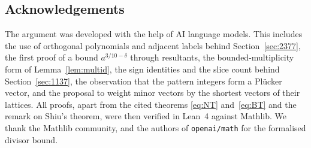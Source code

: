 \documentclass[11pt]{amsart}
\theoremstyle{definition}
\theoremstyle{remark}
\newcommand{\lean}[1]{\texttt{#1}}
\begin{document}
\subsection*{Acknowledgements}
The argument was developed with the help of AI language models. This includes the use of
orthogonal polynomials and adjacent labels behind Section~\ref{sec:2377}, the first proof of a
bound $a^{3/10-\delta}$ through resultants, the bounded-multiplicity form of
Lemma~\ref{lem:multid}, the sign identities and the slice count behind Section~\ref{sec:1137},
the observation that the pattern integers form a Pl\"ucker vector, and the proposal to weight
minor vectors by the shortest vectors of their lattices. All proofs, apart from the cited
theorems \eqref{eq:NT} and~\eqref{eq:BT} and the remark on Shiu's theorem, were then verified
in Lean~4 against Mathlib. We thank the Mathlib community, and the authors of \lean{openai/math}
for the formalised divisor bound.
\end{document}
